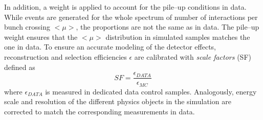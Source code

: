 In addition, a weight is applied  to account for the pile--up
conditions in data. While events are generated for the whole spectrum
of number of interactions per bunch crossing $<\mu>$, the proportions
are not the same as in data. The pile--up weight ensures that the
$<\mu>$ distribution in simulated samples matches the one in data.
To ensure an accurate modeling of the detector effects, reconstruction
and selection efficiencies $\epsilon$ are calibrated with {\it scale factors}
(SF) defined as 
\begin{equation}
SF = \frac{\epsilon_{DATA}}{\epsilon_{MC}}
\end{equation}
where $\epsilon_{DATA}$ is measured in dedicated data control samples.
Analogously, energy scale and resolution of the different physics
objects in the simulation are corrected to match the corresponding
measurements in data.
